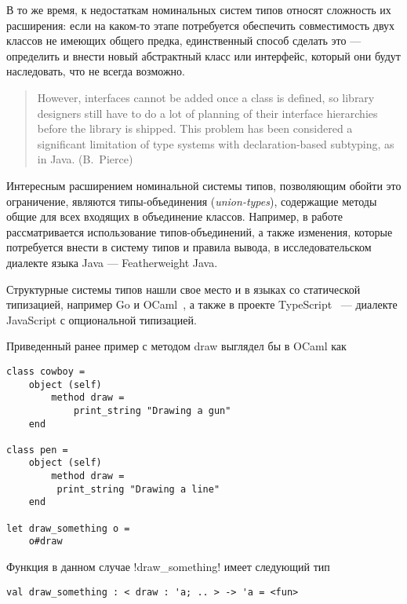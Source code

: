 В то же время, к недостаткам номинальных систем типов относят сложность их
расширения: если на каком-то этапе потребуется обеспечить совместимость двух
классов не имеющих общего предка, единственный способ сделать это --- определить
и внести новый абстрактный класс или интерфейс, который они будут наследовать,
что не всегда возможно.  

\begin{quote}
However, interfaces cannot be added once a class is defined, so library
designers still have to do a lot of planning of their interface hierarchies
before the library is shipped. This problem has been considered a significant
limitation of type systems with declaration-based subtyping, as in Java.
(B.~Pierce)
\end{quote}

Интересным расширением номинальной системы типов, позволяющим обойти это
ограничение, являются типы-объединения (\emph{union-types}), содержащие методы
общие для всех входящих в объединение классов. Например, в
работе~\cite{Igarashi2006} рассматривается использование типов-объединений, а
также изменения, которые потребуется внести в систему типов и правила вывода, в
исследовательском диалекте языка Java --- Featherweight Java.

Структурные системы типов нашли свое место и в языках со статической
типизацией, например Go и OCaml~\cite[с.~33]{Ocaml}, а также в проекте
TypeScript~\cite[]{TypeScript} --- диалекте JavaScript с опциональной
типизацией. 

Приведенный ранее пример с методом draw выглядел бы в OCaml как

\lstset{language=[Objective]Caml}
\begin{lstlisting}
class cowboy =
    object (self)
        method draw =
            print_string "Drawing a gun"
    end

class pen = 
    object (self) 
        method draw =
         print_string "Drawing a line"
    end

let draw_something o =
    o#draw

\end{lstlisting}

Функция в данном случае !draw_something! имеет следующий тип

\begin{lstlisting}
val draw_something : < draw : 'a; .. > -> 'a = <fun>
\end{lstlisting}

